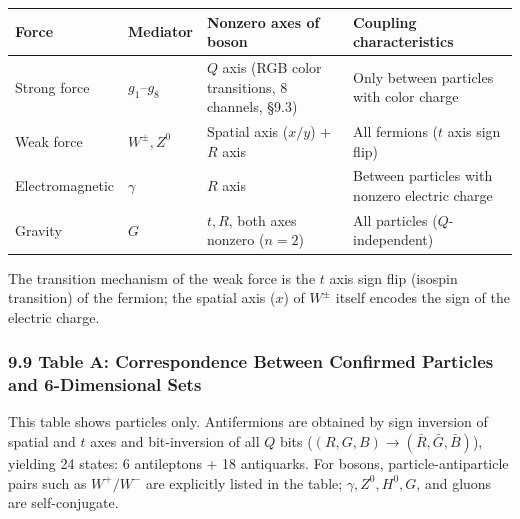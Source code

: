 \documentclass[
  a4paper,11pt]{article}
\newcounter{none}
\theoremstyle{definition}
\theoremstyle{remark}
\begin{document}
{\def\LTcaptype{none} %
\begin{longtable}[]{@{}
  >{\raggedright\arraybackslash}p{}
  >{\raggedright\arraybackslash}p{}
  >{\raggedright\arraybackslash}p{}
  >{\raggedright\arraybackslash}p{}@{}}
\toprule\noalign{}
\begin{minipage}[b]{\linewidth}\raggedright
Force
\end{minipage} & \begin{minipage}[b]{\linewidth}\raggedright
Mediator
\end{minipage} & \begin{minipage}[b]{\linewidth}\raggedright
Nonzero axes of boson
\end{minipage} & \begin{minipage}[b]{\linewidth}\raggedright
Coupling characteristics
\end{minipage} \\
\midrule\noalign{}
\endhead
\bottomrule\noalign{}
\endlastfoot
Strong force & \(g_1\)--\(g_8\) & \(Q\) axis (RGB color transitions, 8
channels, §9.3) & Only between particles with color charge \\
Weak force & \(W^\pm, Z^0\) & Spatial axis (\(x / y\)) + \(R\) axis &
All fermions (\(t\) axis sign flip) \\
Electromagnetic & \(\gamma\) & \(R\) axis & Between particles with
nonzero electric charge \\
Gravity & \(G\) & \(t, R\), both axes nonzero (\(n = 2\)) & All
particles (\(Q\)-independent) \\
\end{longtable}
}

The transition mechanism of the weak force is the \(t\) axis sign flip
(isospin transition) of the fermion; the spatial axis (\(x\)) of
\(W^\pm\) itself encodes the sign of the electric charge.

\subsubsection{9.9 Table A: Correspondence Between Confirmed Particles
and 6-Dimensional
Sets}\label{table-a-correspondence-between-confirmed-particles-and-6-dimensional-sets}

This table shows particles only. Antifermions are obtained by sign
inversion of spatial and \(t\) axes and bit-inversion of all \(Q\) bits
(\((R,G,B) \to (\bar{R},\bar{G},\bar{B})\)), yielding 24 states: 6
antileptons + 18 antiquarks. For bosons, particle-antiparticle pairs
such as \(W^+/W^-\) are explicitly listed in the table;
\(\gamma, Z^0, H^0, G\), and gluons are self-conjugate.
\end{document}
